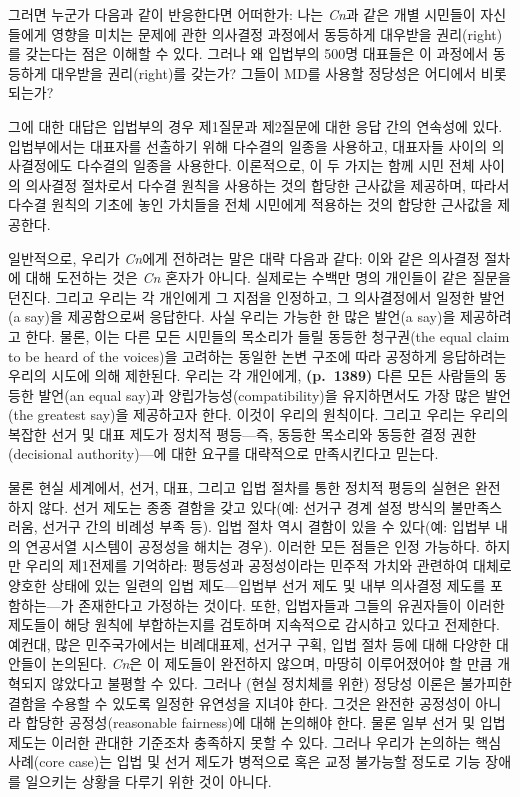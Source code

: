 \documentclass[a4paper,12pt,oneside]{article}  %
\begin{document}
그러면 누군가 다음과 같이 반응한다면 어떠한가: 나는 \emph{Cn}과 같은 개별
시민들이 자신들에게 영향을 미치는 문제에 관한 의사결정 과정에서 동등하게
대우받을 권리(right)를 갖는다는 점은 이해할 수 있다. 그러나 왜 입법부의
500명 대표들은 이 과정에서 동등하게 대우받을 권리(right)를 갖는가?
그들이 MD를 사용할 정당성은 어디에서 비롯되는가?

그에 대한 대답은 입법부의 경우 제1질문과 제2질문에 대한 응답 간의
연속성에 있다. 입법부에서는 대표자를 선출하기 위해 다수결의 일종을
사용하고, 대표자들 사이의 의사결정에도 다수결의 일종을 사용한다.
이론적으로, 이 두 가지는 함께 시민 전체 사이의 의사결정 절차로서 다수결
원칙을 사용하는 것의 합당한 근사값을 제공하며, 따라서 다수결 원칙의
기초에 놓인 가치들을 전체 시민에게 적용하는 것의 합당한 근사값을
제공한다.

일반적으로, 우리가 \emph{Cn}에게 전하려는 말은 대략 다음과 같다: 이와 같은
의사결정 절차에 대해 도전하는 것은 \emph{Cn} 혼자가 아니다. 실제로는 수백만
명의 개인들이 같은 질문을 던진다. 그리고 우리는 각 개인에게 그 지점을
인정하고, 그 의사결정에서 일정한 발언(a say)을 제공함으로써 응답한다.
사실 우리는 가능한 한 많은 발언(a say)을 제공하려고 한다. 물론, 이는
다른 모든 시민들의 목소리가 들릴 동등한 청구권(the equal claim to be
heard of the voices)을 고려하는 동일한 논변 구조에 따라 공정하게
응답하려는 우리의 시도에 의해 제한된다. 우리는 각 개인에게,
\textbf{(p.~1389)} 다른 모든 사람들의 동등한 발언(an equal say)과
양립가능성(compatibility)을 유지하면서도 가장 많은 발언(the greatest
say)을 제공하고자 한다. 이것이 우리의 원칙이다. 그리고 우리는 우리의
복잡한 선거 및 대표 제도가 정치적 평등---즉, 동등한 목소리와 동등한 결정
권한(decisional authority)---에 대한 요구를 대략적으로 만족시킨다고
믿는다.

물론 현실 세계에서, 선거, 대표, 그리고 입법 절차를 통한 정치적 평등의
실현은 완전하지 않다. 선거 제도는 종종 결함을 갖고 있다(예: 선거구 경계
설정 방식의 불만족스러움, 선거구 간의 비례성 부족 등). 입법 절차 역시
결함이 있을 수 있다(예: 입법부 내의 연공서열 시스템이 공정성을 해치는
경우). 이러한 모든 점들은 인정 가능하다. 하지만 우리의 제1전제를
기억하라: 평등성과 공정성이라는 민주적 가치와 관련하여 대체로 양호한
상태에 있는 일련의 입법 제도---입법부 선거 제도 및 내부 의사결정 제도를
포함하는---가 존재한다고 가정하는 것이다. 또한, 입법자들과 그들의
유권자들이 이러한 제도들이 해당 원칙에 부합하는지를 검토하며 지속적으로
감시하고 있다고 전제한다. 예컨대, 많은 민주국가에서는 비례대표제, 선거구
구획, 입법 절차 등에 대해 다양한 대안들이 논의된다. \emph{Cn}은 이 제도들이
완전하지 않으며, 마땅히 이루어졌어야 할 만큼 개혁되지 않았다고 불평할 수
있다. 그러나 (현실 정치체를 위한) 정당성 이론은 불가피한 결함을 수용할
수 있도록 일정한 유연성을 지녀야 한다. 그것은 완전한 공정성이 아니라
합당한 공정성(reasonable fairness)에 대해 논의해야 한다. 물론 일부 선거
및 입법 제도는 이러한 관대한 기준조차 충족하지 못할 수 있다. 그러나
우리가 논의하는 핵심 사례(core case)는 입법 및 선거 제도가 병적으로 혹은
교정 불가능할 정도로 기능 장애를 일으키는 상황을 다루기 위한 것이
아니다.
\end{document}
